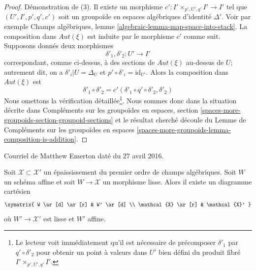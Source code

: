 \begin{proof}
\medskip\noindent
Démonstration de (3). Il existe un morphisme $c' : I' \times_{p', U', q'} I' \to I'$
tel que $(U', I', p', q', c')$ soit un groupoïde en espaces algébriques
d'identité $\Delta'$. Voir par exemple
Champs algébriques, lemme \ref{algebraic-lemma-map-space-into-stack}.
La composition dans $\mathit{Aut}(\xi)$ est induite par le morphisme
$c'$ comme suit. Supposons donnés deux morphismes
$$
\delta'_1, \delta'_2 : U' \longrightarrow I'
$$
correspondant, comme ci-dessus, à des sections de $\mathit{Aut}(\xi)$ au-dessus de $U$;
autrement dit, on a $\delta'_i|U = \Delta_U$ et
$p' \circ \delta'_i = \text{id}_{U'}$. Alors la composition
dans $\mathit{Aut}(\xi)$ est
$$
\delta'_1 \circ \delta'_2 = c'(\delta'_1 \circ q' \circ \delta'_2, \delta'_2)
$$
Nous omettons la vérification détaillée\footnote{Le lecteur voit immédiatement
qu'il est nécessaire de précomposer
$\delta'_1$ par $q' \circ \delta'_2$ pour obtenir un point à valeurs dans $U'$
bien défini du produit fibré $I' \times_{p', U', q'} I'$.}.
Nous sommes donc dans la situation décrite dans
Compléments sur les groupoïdes en espaces, section
\ref{spaces-more-groupoids-section-groupoid-sections}
et le résultat cherché découle du
Lemme de Compléments sur les groupoïdes en espaces
\ref{spaces-more-groupoids-lemma-composition-is-addition}.
\end{proof}

\begin{proposition}[Emerton]
\label{proposition-affine-smooth-lift-to-first-order}
\begin{reference}
Courriel de Matthew Emerton daté du 27 avril 2016.
\end{reference}
Soit $\mathcal{X} \subset \mathcal{X}'$ un épaississement du premier ordre
de champs algébriques. Soit $W$ un schéma affine et soit
$W \to \mathcal{X}$ un morphisme lisse. Alors il existe
un diagramme cartésien
$$
\xymatrix{
W \ar[d] \ar[r] & W' \ar[d] \\
\mathcal{X} \ar[r] & \mathcal{X}'
}
$$
où $W' \to \mathcal{X}'$ est lisse et $W'$ affine.
\end{proposition}

